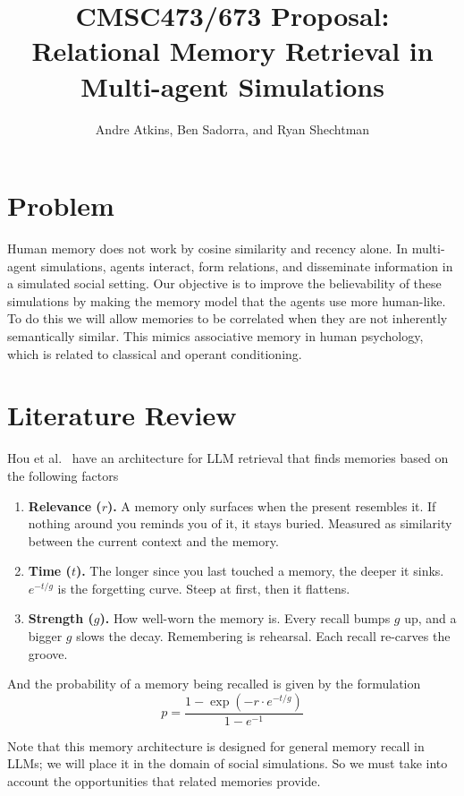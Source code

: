\documentclass[11pt]{article}
\title{CMSC473/673 Proposal: Relational Memory Retrieval in Multi-agent Simulations}
\author{Andre Atkins, Ben Sadorra, and Ryan Shechtman}
\date{}
\begin{document}
\maketitle

\section{Problem}
Human memory does not work by cosine similarity and recency alone. In multi-agent simulations, agents interact, form relations, and disseminate information in a simulated social setting. Our objective is to improve the believability of these simulations by making the memory model that the agents use more human-like. To do this we will allow memories to be correlated when they are not inherently semantically similar. This mimics associative memory in human psychology, which is related to classical and operant conditioning.

\section{Literature Review}
Hou et al.~\cite{hou2024} have an architecture for LLM retrieval that finds memories based on the following factors

\begin{enumerate}
  \item \textbf{Relevance ($r$).} A memory only surfaces when the present resembles it. If nothing around you reminds you of it, it stays buried. Measured as similarity between the current context and the memory.
  \item \textbf{Time ($t$).} The longer since you last touched a memory, the deeper it sinks. $e^{-t/g}$ is the forgetting curve. Steep at first, then it flattens.
  \item \textbf{Strength ($g$).} How well-worn the memory is. Every recall bumps $g$ up, and a bigger $g$ slows the decay. Remembering is rehearsal. Each recall re-carves the groove.
\end{enumerate}

And the probability of a memory being recalled is given by the formulation
\[
p = \frac{1 - \exp\!\left(-r \cdot e^{-t/g}\right)}{1 - e^{-1}}
\]

Note that this memory architecture is designed for general memory recall in LLMs; we will place it in the domain of social simulations. So we must take into account the opportunities that related memories provide.
\end{document}
